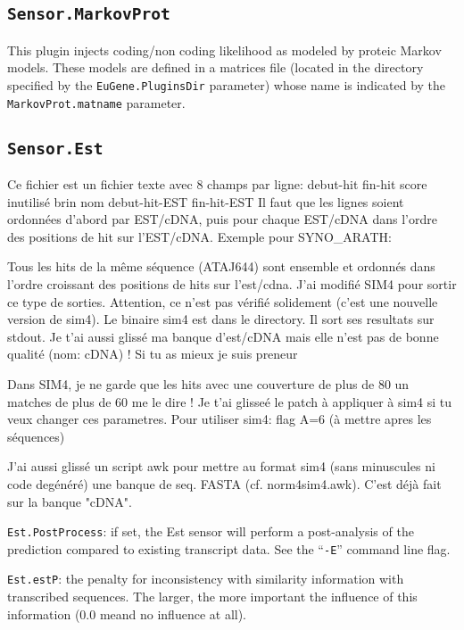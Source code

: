 \documentclass[a4paper,titlepage]{report}
\begin{document}
\subsection{\texttt{Sensor.MarkovProt}}

This plugin injects coding/non coding likelihood as modeled by proteic
Markov models. These models are defined in a matrices file  (located in the directory 
specified by the \texttt{EuGene.PluginsDir} parameter) whose name
is indicated by the \texttt{MarkovProt.matname} parameter. 

\subsection{\texttt{Sensor.Est}}
\label{plugest}

Ce fichier est un fichier texte avec 8 champs par ligne: debut-hit
fin-hit score inutilis\'e brin nom debut-hit-EST fin-hit-EST Il faut
que les lignes soient ordonn\'ees d'abord par EST/cDNA, puis pour
chaque EST/cDNA dans l'ordre des positions de hit sur l'EST/cDNA.
Exemple pour SYNO\_ARATH:

Tous les hits de la m\^eme s\'equence (ATAJ644) sont ensemble et ordonn\'es
dans l'ordre croissant des positions de hits sur l'est/cdna.  J'ai
modifi\'e SIM4 pour sortir ce type de sorties. Attention, ce n'est pas
v\'erifi\'e solidement (c'est une nouvelle version de sim4). Le binaire sim4
est dans le directory. Il sort ses resultats sur stdout. Je t'ai aussi
gliss\'e ma banque d'est/cDNA mais elle n'est pas de bonne qualit\'e (nom:
cDNA) ! Si tu as mieux je suis preneur

Dans SIM4, je ne garde que les hits avec une couverture de plus de 80%
un matches de plus de 60%
me le dire !  Je t'ai glisse\'e le patch \`a appliquer \`a sim4 si tu veux
changer ces parametres. Pour utiliser sim4: flag A=6 (\`a mettre apres
les s\'equences)


J'ai aussi gliss\'e un script awk pour mettre au format sim4 (sans
minuscules ni code deg\'en\'er\'e) une banque de seq. FASTA (cf.
norm4sim4.awk). C'est d\'ej\`a fait sur la banque "cDNA".


\texttt{Est.PostProcess}: if set, the Est sensor will perform a
post-analysis of the prediction compared to existing transcript data.
See the ``\texttt{-E}'' command line flag.
  
\texttt{Est.estP}: the penalty for inconsistency with similarity
information with transcribed sequences.  The larger, the more
important the influence of this information (0.0 meand no influence at
all).
  
\end{document}
